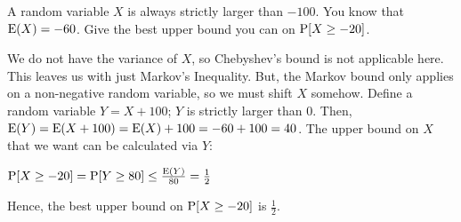 \question A random variable $X$ is always strictly larger than $-100$. You know 
that $\E(X) = -60$. Give the best upper bound you can on $\P[X \geq -20]$.
\begin{solution}[2cm]
We do not have the variance of $X$, so Chebyshev's bound is not applicable here. 
This leaves us with just Markov's Inequality. But, the Markov bound only applies on a non-negative random variable, so we must shift $X$ somehow. Define a random variable $Y = X + 100$; $Y$ is strictly larger than 0. Then, $\E(Y) = \E(X +100) = \E(X)+100 = -60+100 = 40$. The upper bound on $X$ that we want can be calculated via $Y$:
					
$\P[X \geq -20] = \P[Y \geq 80] \leq \frac{\E(Y)}{80} = \frac{1}{2}$
					
Hence, the best upper bound on $\P[X \geq -20]$ is $\frac{1}{2}$. 
\end{solution}
